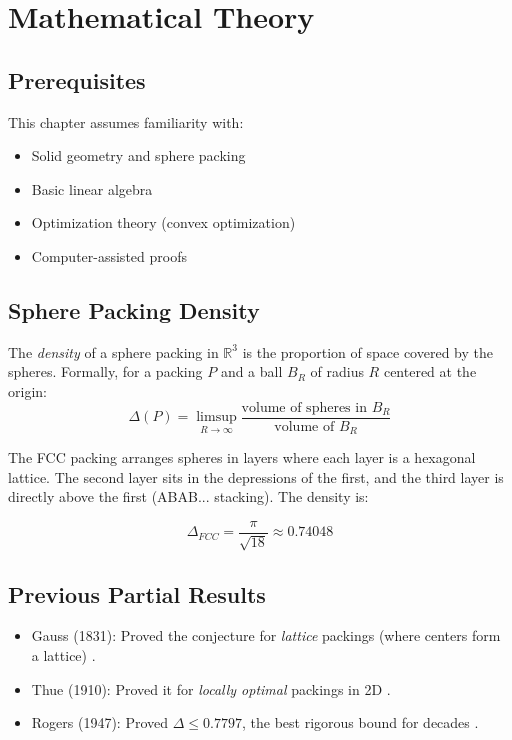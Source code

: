 \section{Mathematical Theory}


\subsection{Prerequisites}
This chapter assumes familiarity with:
\begin{itemize}
\item Solid geometry and sphere packing
\item Basic linear algebra
\item Optimization theory (convex optimization)
\item Computer-assisted proofs
\end{itemize}

\subsection{Sphere Packing Density}

\begin{definition}
The \emph{density} of a sphere packing in $\mathbb{R}^3$ is the proportion of space covered by the spheres. Formally, for a packing $P$ and a ball $B_R$ of radius $R$ centered at the origin:
\[\Delta(P) = \limsup_{R \to \infty} \frac{\text{volume of spheres in } B_R}{\text{volume of } B_R}\]
\end{definition}

The FCC packing arranges spheres in layers where each layer is a hexagonal lattice. The second layer sits in the depressions of the first, and the third layer is directly above the first (ABAB... stacking). The density is:

\begin{equation}
\Delta_{FCC} = \frac{\pi}{\sqrt{18}} \approx 0.74048
\end{equation}

\subsection{Previous Partial Results}

\begin{itemize}
\item Gauss (1831): Proved the conjecture for \emph{lattice} packings (where centers form a lattice) \cite{gauss1831}.
\item Thue (1910): Proved it for \emph{locally optimal} packings in 2D \cite{thue1910}.
\item Rogers (1947): Proved $\Delta \leq 0.7797$, the best rigorous bound for decades \cite{rogers1947}.
\end{itemize}


